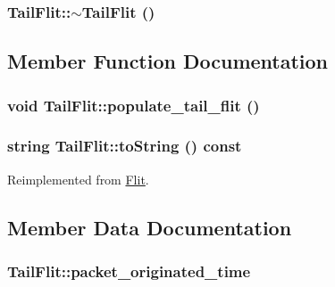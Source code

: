 \hypertarget{classTailFlit_cec72c081d6ca5585b3f8cd1402f4783}{
\subsubsection[{$\sim$TailFlit}]{\setlength{\rightskip}{0pt plus 5cm}TailFlit::$\sim$TailFlit ()}}
\label{classTailFlit_cec72c081d6ca5585b3f8cd1402f4783}




\subsection{Member Function Documentation}
\hypertarget{classTailFlit_76f8023394ec32a7038300b285bfd5fd}{
\subsubsection[{populate\_\-tail\_\-flit}]{\setlength{\rightskip}{0pt plus 5cm}void TailFlit::populate\_\-tail\_\-flit ()}}
\label{classTailFlit_76f8023394ec32a7038300b285bfd5fd}


\hypertarget{classTailFlit_fb1c83457c5d834a8a859269154e3c4d}{
\subsubsection[{toString}]{\setlength{\rightskip}{0pt plus 5cm}string TailFlit::toString () const}}
\label{classTailFlit_fb1c83457c5d834a8a859269154e3c4d}




Reimplemented from \hyperlink{classFlit_ffc6c729a005389b51818aac59710dab}{Flit}.

\subsection{Member Data Documentation}
\hypertarget{classTailFlit_acb87776196c1156133039e53abf8175}{
\subsubsection[{packet\_\-originated\_\-time}]{ {\bf TailFlit::packet\_\-originated\_\-time}}}
\label{classTailFlit_acb87776196c1156133039e53abf8175}


